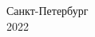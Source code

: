 \begin{titlepage}
\vfill %

\begin{center}
Санкт-Петербург\\
2022
\end{center}

\end{titlepage}

\setcounter{page}{2}